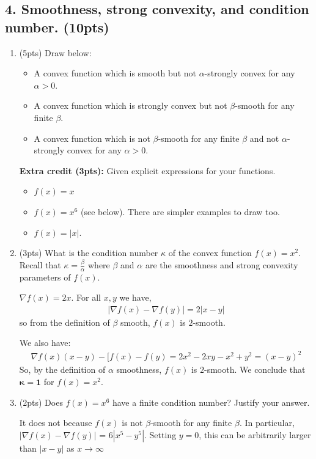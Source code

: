 \documentclass[10pt]{article}
\begin{document}
\subsection{4. Smoothness, strong convexity, and condition number. (\textbf{\small 10pts})}

\begin{enumerate}[label=(\alph*)]
	\item (5pts) Draw below:
	\begin{itemize}
		\item A convex function which is smooth but not $\alpha$-strongly convex for any $\alpha > 0$.
		\item A convex function which is strongly convex but not $\beta$-smooth for any finite $\beta$. 
		\item A convex function which is not $\beta$-smooth for any finite $\beta$ and not $\alpha$-strongly convex for any $\alpha > 0$.
	\end{itemize} 
\textbf{Extra credit (3pts):} Given explicit expressions for your functions.
	
	\begin{itemize}
		\item $f(x) = x$
		\item $f(x) = x^6$ (see below). There are simpler examples to draw too.
		\item $f(x) = |x|$.
	\end{itemize}
	
	\item (3pts) What is the condition number  $\kappa$ of the convex function $f(x) = x^2$. Recall that $\kappa = \frac{\beta}{\alpha}$ where $\beta$ and $\alpha$ are the smoothness and strong convexity parameters of $f(x)$. 
	\vspace{1em} 
	
	$\nabla f(x) = 2x.$ For all $x,y$ we have,
	\begin{align*}
	|\nabla f(x)  - \nabla f(y)| = 2|x - y|
	\end{align*}
	so from the definition of $\beta$ smooth, $f(x)$ is $2$-smooth.
	
	We also have:
	\begin{align*}
	\nabla f(x) (x - y) - [f(x) - f(y) = 2x^2 - 2xy - x^2 + y^2 = (x - y)^2
	\end{align*}
	So, by the definition of $\alpha$ smoothness, $f(x)$ is $2$-smooth. 
	We conclude that $\mathbf{\boldsymbol{\kappa} = 1}$ for $f(x) = x^2$. 
	
	\item (2pts) Does $f(x) = x^6$ have a finite condition number? 
	Justify your answer. 
	\vspace{1em} 
	
	It does not because $f(x)$ is not $\beta$-smooth for any finite $\beta$. In particular, $|\nabla f(x)  - \nabla f(y)|$ = $6 |x^5 - y^5|$. Setting $y = 0$, this can be arbitrarily larger than $|x - y|$ as $x \rightarrow \infty$
\end{enumerate}
\end{document}
